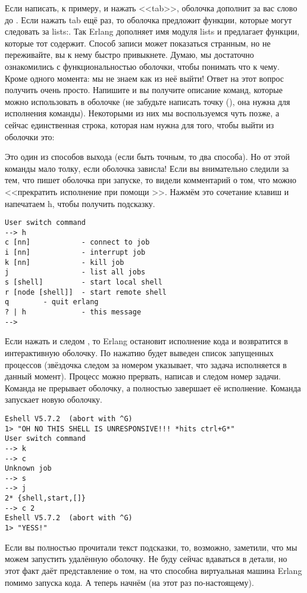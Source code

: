 Если написать, к примеру,  и нажать <<tab>>, оболочка дополнит за вас слово до .
Если нажать tab ещё раз, то оболочка предложит функции, которые могут следовать за lists:.
Так Erlang дополняет имя модуля lists и предлагает функции, которые тот содержит.
Способ записи может показаться странным, но не переживайте, вы к нему быстро привыкнете.
Думаю, мы достаточно ознакомились с функциональностью оболочки, чтобы понимать что к чему.
Кроме одного момента: мы не знаем как из неё выйти!
Ответ на этот вопрос получить очень просто.
Напишите  и вы получите описание команд, которые можно использовать в оболочке (не забудьте написать точку (), она нужна для исполнения команды).
Некоторыми из них мы воспользуемся чуть позже, а сейчас единственная строка, которая нам нужна для того, чтобы выйти из оболочки это:\\ 

Это один из способов выхода (если быть точным, то два способа).
Но от этой команды мало толку, если оболочка зависла!
Если вы внимательно следили за тем, что пишет оболочка при запуске, то видели комментарий о том, что можно <<прекратить исполнение при помощи >>.
Нажмём это сочетание клавиш и напечатаем h, чтобы получить подсказку.
\begin{lstlisting}[style=repl]
User switch command
--> h
c [nn]            - connect to job
i [nn]            - interrupt job
k [nn]            - kill job
j                 - list all jobs
s [shell]         - start local shell
r [node [shell]]  - start remote shell
q        - quit erlang
? | h             - this message
-->
\end{lstlisting}

Если нажать  и следом , то Erlang остановит исполнение кода и возвратится в интерактивную оболочку.
По нажатию  будет выведен список запущенных процессов (звёздочка следом за номером указывает, что задача исполняется в данный момент).
Процесс можно прервать, написав  и следом номер задачи.
Команда  не прерывает оболочку, а полностью завершает её исполнение.
Команда  запускает новую оболочку.
\begin{lstlisting}[style=repl]
Eshell V5.7.2  (abort with ^G)
1> "OH NO THIS SHELL IS UNRESPONSIVE!!! *hits ctrl+G*"
User switch command
--> k
--> c
Unknown job
--> s
--> j
2* {shell,start,[]}
--> c 2
Eshell V5.7.2  (abort with ^G)
1> "YESS!"
\end{lstlisting}

Если вы полностью прочитали текст подсказки, то, возможно, заметили, что мы можем запустить удалённую оболочку.
Не буду сейчас вдаваться в детали, но этот факт даёт представление о том, на что способна виртуальная машина Erlang помимо запуска кода.
А теперь начнём (на этот раз по\--настоящему).
